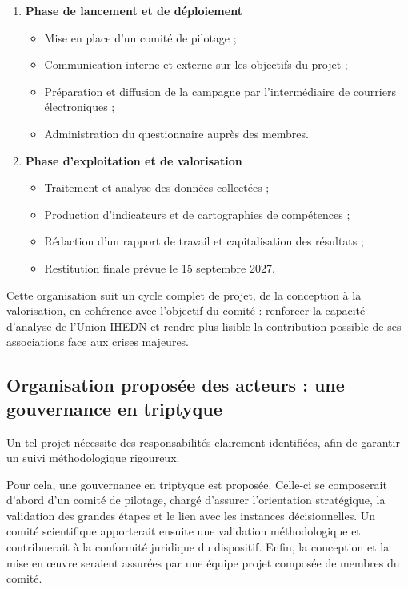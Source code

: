 \begin{enumerate}
    \item \textbf{Phase de lancement et de déploiement}
    \begin{itemize}
        \item Mise en place d'un comité de pilotage ;
        \item Communication interne et externe sur les objectifs du projet ;
        \item Préparation et diffusion de la campagne par l'intermédiaire de courriers électroniques ;
        \item Administration du questionnaire auprès des membres.
    \end{itemize}

    \item \textbf{Phase d'exploitation et de valorisation}
    \begin{itemize}
        \item Traitement et analyse des données collectées ;
        \item Production d'indicateurs et de cartographies de compétences ;
        \item Rédaction d'un rapport de travail et capitalisation des résultats ;
        \item Restitution finale prévue le 15 septembre 2027.
    \end{itemize}
\end{enumerate}

Cette organisation suit un cycle complet de projet, de la conception à la valorisation, en cohérence avec l'objectif du comité : renforcer la capacité d'analyse de l'Union-IHEDN et rendre plus lisible la contribution possible de ses associations face aux crises majeures.

\subsection{Organisation proposée des acteurs : une gouvernance en triptyque}

Un tel projet nécessite des responsabilités clairement identifiées, afin de garantir un suivi méthodologique rigoureux.

Pour cela, une gouvernance en triptyque est proposée. Celle-ci se composerait d'abord d'un comité de pilotage, chargé d'assurer l'orientation stratégique, la validation des grandes étapes et le lien avec les instances décisionnelles. Un comité scientifique apporterait ensuite une validation méthodologique et contribuerait à la conformité juridique du dispositif. Enfin, la conception et la mise en \oe{}uvre seraient assurées par une équipe projet composée de membres du comité.

